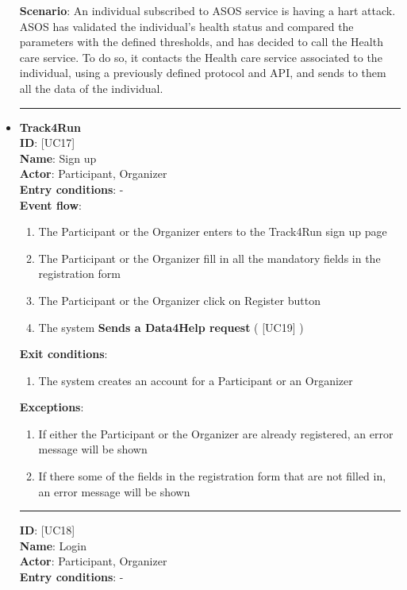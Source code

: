 \documentclass[hidelinks, 12pt]{report}
\newcommand\usecase[1]{ [UC#1] }
\begin{document}
\begin{itemize}
		\textbf{Scenario}: An individual subscribed to ASOS service is having a hart attack. ASOS has validated the individual's health status and compared the parameters with the defined thresholds, and has decided to call the Health care service. To do so, it contacts the Health care service associated to the individual, using a previously defined protocol and API, and sends to them all the data of the individual. \\
		\rule{\linewidth}{0.4pt}
		\item{\textbf{Track4Run}}\\
		\textbf{ID}: \usecase{17} \\
		\textbf{Name}: Sign up \\
		\textbf{Actor}: Participant, Organizer \\
		\textbf{Entry conditions}: - \\
		\textbf{Event flow}:
		\begin{enumerate}
			\item{The Participant or the Organizer enters to the Track4Run sign up page}
			\item{The Participant or the Organizer fill in all the mandatory fields in the registration form}
			\item{The Participant or the Organizer click on Register button}
			\item{The system \textbf{Sends a Data4Help request} (\usecase{19})}
		\end{enumerate}
		\textbf{Exit conditions}:
		\begin{enumerate}
			\item{The system creates an account for a Participant or an Organizer}
		\end{enumerate}
		\textbf{Exceptions}:
		\begin{enumerate}
			\item{If either the Participant or the Organizer are already registered, an error message will be shown}
			\item{If there some of the fields in the registration form that are not filled in, an error message will be shown}
		\end{enumerate}
		\rule{\linewidth}{0.4pt}
		\textbf{ID}: \usecase{18} \\
		\textbf{Name}: Login \\
		\textbf{Actor}: Participant, Organizer \\
		\textbf{Entry conditions}: - \\

\end{itemize}
\end{document}
